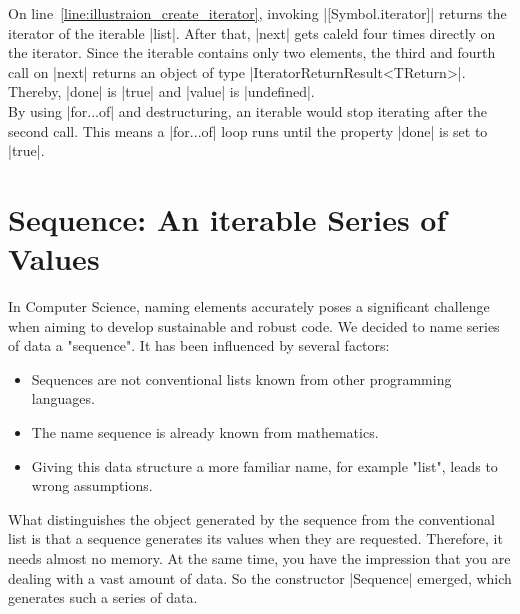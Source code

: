 On line~\ref{line:illustraion_create_iterator}, invoking |[Symbol.iterator]|
returns the iterator of the iterable |list|. 
After that, |next| gets caleld four times directly on the iterator. Since the
iterable contains only two elements, the third and fourth call on |next|
returns an object of type |IteratorReturnResult<TReturn>|. Thereby, |done| is
|true| and |value| is |undefined|. \\
By using |for...of| and destructuring, an iterable would stop iterating after
the second call. This means a |for...of| loop runs until the property |done|
is set to |true|.

\section{Sequence: An iterable Series of Values}
\label{sec:Sequence: A Series of Values}
In Computer Science, naming elements accurately poses a significant challenge 
when aiming to develop sustainable and robust code. We decided to name series
of data a "sequence". It has been influenced by several factors:

\begin{itemize}
  \item Sequences are not conventional lists known from other programming
    languages.
\item The name sequence is already known from mathematics.
\item Giving this data structure a more familiar name, for example "list",
  leads to wrong assumptions. 
\end{itemize}
What distinguishes the object generated by the sequence from the conventional
list is that a sequence generates its values when they are requested.
Therefore, it needs almost no memory. At the same time, you have the impression
that you are dealing with a vast amount of data. So the constructor |Sequence|
emerged, which generates such a series of data.


